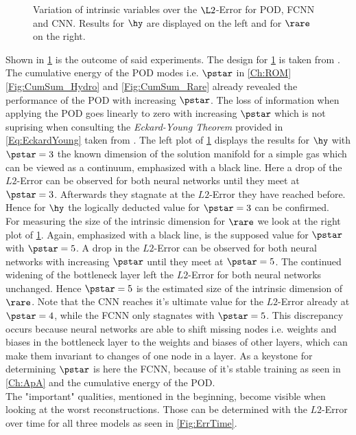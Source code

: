 \begin{figure}[htbp!]
	
	\caption{Variation of intrinsic variables over the $\L2$-Error for POD, FCNN and CNN. Results for $\hy$ are displayed on the left and for $\rare$ on the right.}
	\label{Fig:IntVar}
\end{figure}
Shown in \cref{Fig:IntVar} is the outcome of said experiments. The design for \cref{Fig:IntVar} is taken from \cite{Carlberg}. The cumulative energy of the POD modes i.e. $\pstar$ in \cref{Ch:ROM} \cref{Fig:CumSum_Hydro} and \cref{Fig:CumSum_Rare} already revealed the performance of the POD with increasing $\pstar$. The loss of information when applying the POD goes linearly to zero with increasing $\pstar$ which is not suprising when consulting the \textit{Eckard-Young Theorem} provided in \cref{Eq:EckardYoung} taken from \cite{Kutz}.
The left plot of \cref{Fig:IntVar} displays the results for $\hy$ with $\pstar=3$ the known dimension of the solution manifold for a simple gas which can be viewed as a continuum, emphasized with a black line. Here a drop of the $L2$-Error can be observed for both neural networks until they meet at $\pstar = 3$. Afterwards they stagnate at the $L2$-Error they have reached before. Hence for $\hy$ the logically deducted value for $\pstar=3$ can be confirmed.\\
For measuring the size of the intrinsic dimension for $\rare$ we look at the right plot of \cref{Fig:IntVar}. Again, emphasized  with a black line, is the supposed value for $\pstar$ with $\pstar=5$. A drop in the $L2$-Error can be observed for both neural networks with increasing $\pstar$ until they meet at $\pstar = 5$. The continued widening of the bottleneck layer left the $L2$-Error for both neural networks unchanged. Hence $\pstar=5$ is the estimated size of the intrinsic dimension of $\rare$. Note that the CNN reaches it's ultimate value for the $L2$-Error already at $\pstar=4$, while the FCNN only stagnates with $\pstar=5$. This discrepancy occurs because neural networks are able to shift missing nodes i.e. weights and biases in the bottleneck layer to the weights and biases of other layers, which can make them invariant to changes of one node in a layer. As a keystone for determining $\pstar$ is here the FCNN, because of it's stable training as seen in \cref{Ch:ApA} and the cumulative energy of the POD.\\
The "important" qualities, mentioned in the beginning, become visible when looking at the worst reconstructions. Those can be determined with the $L2$-Error over time for all three models as seen in \cref{Fig:ErrTime}.

